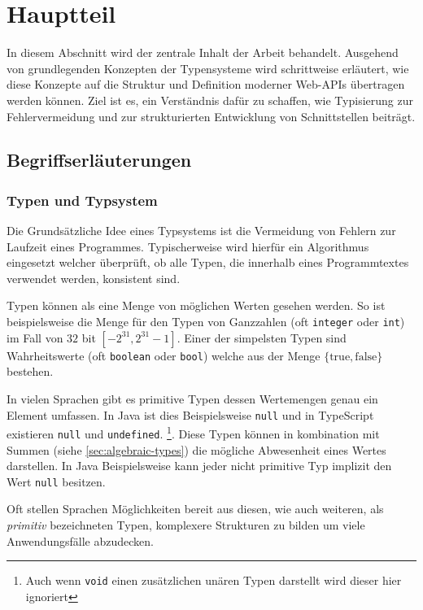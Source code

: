
\section{Hauptteil}

In diesem Abschnitt wird der zentrale Inhalt der Arbeit behandelt.
Ausgehend von grundlegenden Konzepten der Typensysteme wird schrittweise erläutert, 
wie diese Konzepte auf die Struktur und Definition moderner Web-APIs übertragen werden können.
Ziel ist es, ein Verständnis dafür zu schaffen, wie Typisierung zur Fehlervermeidung und zur 
strukturierten Entwicklung von Schnittstellen beiträgt.

\subsection{Begriffserläuterungen}

\subsubsection{Typen und Typsystem}

Die Grundsätzliche Idee eines Typsystems ist die Vermeidung von Fehlern zur
Laufzeit eines Programmes. Typischerweise wird hierfür ein Algorithmus eingesetzt welcher überprüft,
ob alle Typen, die innerhalb eines Programmtextes verwendet werden, konsistent sind.

Typen können als eine Menge von möglichen Werten gesehen werden. So ist beispielsweise die Menge
für den Typen von Ganzzahlen (oft \texttt{integer} oder \texttt{int}) im Fall von $32$ bit
$[-2^{31},2^{31}-1]$.
Einer der simpelsten Typen sind Wahrheitswerte (oft \texttt{boolean} oder \texttt{bool}) welche aus 
der Menge $\{\text{true}, \text{false}\}$ bestehen.

In vielen Sprachen gibt es primitive Typen dessen Wertemengen genau ein Element umfassen. In Java ist dies Beispielsweise
\texttt{null} und in TypeScript existieren \texttt{null} und \texttt{undefined}. \footnote{Auch wenn \texttt{void} einen zusätzlichen unären Typen darstellt wird dieser hier ignoriert}. Diese Typen können in kombination mit Summen (siehe \ref{sec:algebraic-types}) die mögliche Abwesenheit eines Wertes darstellen.
In Java Beispielsweise kann jeder nicht primitive Typ implizit den Wert \texttt{null} besitzen.

Oft stellen Sprachen Möglichkeiten bereit aus diesen, wie auch weiteren,
als \textit{primitiv} bezeichneten Typen, komplexere Strukturen zu bilden um viele Anwendungsfälle
abzudecken.

